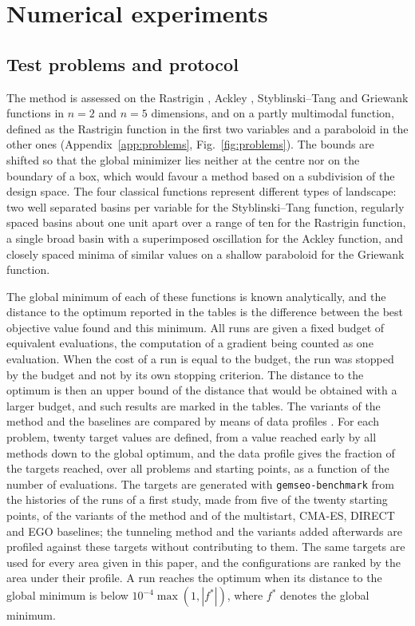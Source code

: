\documentclass[pdflatex,sn-basic]{sn-jnl}
\newcommand{\code}[1]{\texttt{\hyphenchar\font=45\relax #1}}
\begin{document}
\section{Numerical experiments}\label{sec:results}

\subsection{Test problems and protocol}\label{sec:protocol}

The method is assessed on the Rastrigin \citep{rastrigin1974,torn1989}, Ackley
\citep{ackley1987}, Styblinski--Tang \citep{styblinski1990} and Griewank
\citep{griewank1981} functions \citep[see also][]{jamil2013} in $n = 2$ and
$n = 5$ dimensions, and on a partly multimodal function, defined as the Rastrigin
function in the first two variables and a paraboloid in the other ones
(Appendix~\ref{app:problems}, Fig.~\ref{fig:problems}). The bounds are shifted so
that the global minimizer lies neither at the centre nor on the boundary of a box,
which would favour a method based on a subdivision of the design space. The four
classical functions represent different types of landscape: two well separated
basins per variable for the Styblinski--Tang function, regularly spaced basins
about one unit apart over a range of ten for the Rastrigin function, a single
broad basin with a superimposed oscillation for the Ackley function, and closely
spaced minima of similar values on a shallow paraboloid for the Griewank
function.

The global minimum of each of these functions is known analytically, and the
distance to the optimum reported in the tables is the difference between the best
objective value found and this minimum. All runs are given a fixed budget of
equivalent evaluations, the computation of a
gradient being counted as one evaluation. When the cost of a run is equal to the
budget, the run was stopped by the budget and not by its own stopping criterion.
The distance to the optimum is then an upper bound of the distance that would be
obtained with a larger budget, and such results are marked in the tables. The
variants of the method and the baselines are compared by means of data profiles
\citep{more2009}. For each problem, twenty target values are defined, from a value
reached early by all methods down to the global optimum, and the data profile
gives the fraction of the targets reached, over all problems and starting points,
as a function of the number of evaluations. The targets are generated with
\code{gemseo-benchmark} \citep{gemseobenchmark} from the histories of the runs
of a first study, made from five of the twenty starting points, of the variants
of the method and of the multistart, CMA-ES, DIRECT and EGO baselines; the
tunneling method and the variants added afterwards are profiled against these
targets without contributing to them. The same targets are used for every area
given in this paper, and the configurations are ranked by the area under their
profile. A run reaches the optimum when its distance to the global minimum is
below $10^{-4}\max(1, |f^\ast|)$, where $f^\ast$ denotes the global
minimum.
\end{document}
